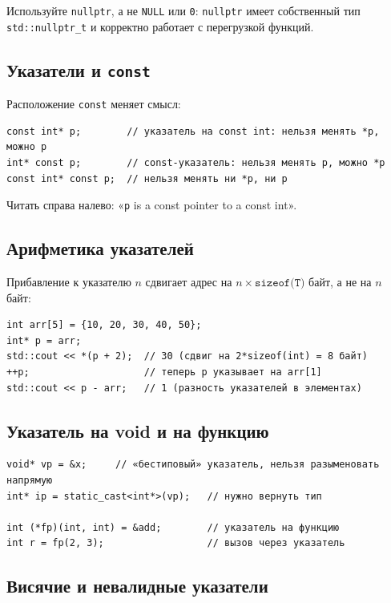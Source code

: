 Используйте \texttt{nullptr}, а не \texttt{NULL} или \texttt{0}: \texttt{nullptr}
имеет собственный тип \texttt{std::nullptr\_t} и корректно работает с перегрузкой
функций.

\subsection{Указатели и \texttt{const}}

Расположение \texttt{const} меняет смысл:

\begin{lstlisting}
const int* p;        // указатель на const int: нельзя менять *p, можно p
int* const p;        // const-указатель: нельзя менять p, можно *p
const int* const p;  // нельзя менять ни *p, ни p
\end{lstlisting}

Читать справа налево: «\texttt{p} is a const pointer to a const int».

\subsection{Арифметика указателей}

Прибавление к указателю $n$ сдвигает адрес на $n \times \texttt{sizeof(T)}$ байт,
а не на $n$ байт:

\begin{lstlisting}
int arr[5] = {10, 20, 30, 40, 50};
int* p = arr;
std::cout << *(p + 2);  // 30 (сдвиг на 2*sizeof(int) = 8 байт)
++p;                    // теперь p указывает на arr[1]
std::cout << p - arr;   // 1 (разность указателей в элементах)
\end{lstlisting}

\subsection{Указатель на void и на функцию}

\begin{lstlisting}
void* vp = &x;     // «бестиповый» указатель, нельзя разыменовать напрямую
int* ip = static_cast<int*>(vp);   // нужно вернуть тип

int (*fp)(int, int) = &add;        // указатель на функцию
int r = fp(2, 3);                  // вызов через указатель
\end{lstlisting}

\subsection{Висячие и невалидные указатели}

